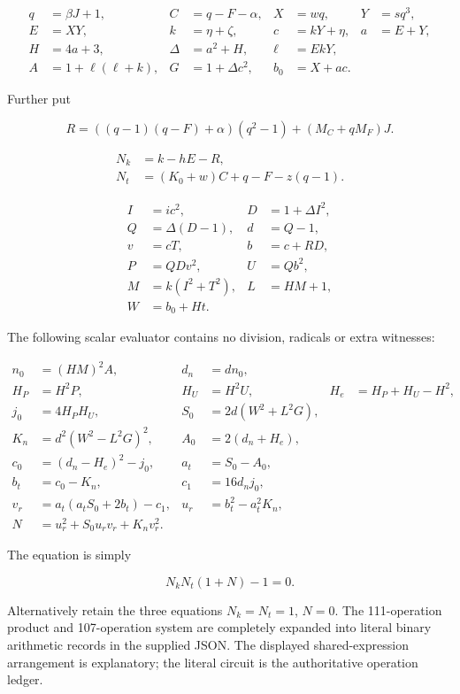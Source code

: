 \documentclass[
  10pt,
]{article}
\begin{document}
\[\begin{aligned}
q&=\beta J+1,& C&=q-F-\alpha,&X&=wq,&Y&=sq^3,\\
E&=XY,&k&=\eta+\zeta,&c&=kY+\eta,&a&=E+Y,\\
H&=4a+3,&\Delta&=a^2+H,&\ell&=EkY,\\
A&=1+\ell(\ell+k),&G&=1+\Delta c^2,&b_0&=X+ac.
\end{aligned}\]

Further put

\[R=((q-1)(q-F)+\alpha)(q^2-1)+(M_C+qM_F)J.\]

\[\begin{aligned}
N_k&=k-hE-R,\\
N_t&=(K_0+w)C+q-F-z(q-1).
\end{aligned}\]

\[\begin{aligned}
I&=ic^2,&D&=1+\Delta I^2,\\
Q&=\Delta(D-1),&d&=Q-1,\\
v&=cT,&b&=c+RD,\\
P&=QDv^2,&U&=Qb^2,\\
M&=k(I^2+T^2),&L&=HM+1,\\
W&=b_0+Ht.&&
\end{aligned}\]

The following scalar evaluator contains no division, radicals or extra
witnesses:

\[\begin{aligned}
n_0&=(HM)^2A,&d_n&=dn_0,\\
H_P&=H^2P,&H_U&=H^2U,&H_e&=H_P+H_U-H^2,\\
j_0&=4H_PH_U,&S_0&=2d(W^2+L^2G),\\
K_n&=d^2(W^2-L^2G)^2,&A_0&=2(d_n+H_e),\\
c_0&=(d_n-H_e)^2-j_0,&a_t&=S_0-A_0,\\
b_t&=c_0-K_n,&c_1&=16d_nj_0,\\
v_r&=a_t(a_tS_0+2b_t)-c_1,&u_r&=b_t^2-a_t^2K_n,\\
N&=u_r^2+S_0u_rv_r+K_nv_r^2.
\end{aligned}\]

The equation is simply

\[\boxed{\quad N_kN_t(1+N)-1=0.\quad}\]

Alternatively retain the three equations \(N_k=N_t=1\), \(N=0\). The
111-operation product and 107-operation system are completely expanded
into literal binary arithmetic records in the supplied JSON. The
displayed shared-expression arrangement is explanatory; the literal
circuit is the authoritative operation ledger.
\end{document}
